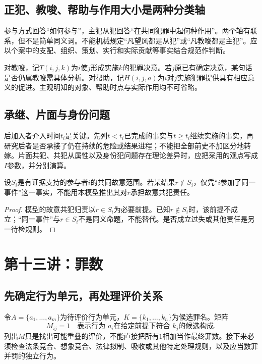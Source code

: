 \subsection{正犯、教唆、帮助与作用大小是两种分类轴}
参与方式回答“如何参与”，主犯从犯回答“在共同犯罪中起何种作用”。两个轴有联系，但不是简单同义词。不能机械规定“凡望风都是从犯”或“凡教唆都是主犯”。应以个案中的支配、组织、策划、实行和实际贡献等事实结合规范作判断。

对教唆，记$T(i,j,k)$为$i$使$j$形成实施$k$的犯罪决意。若$j$原已有确定决意，某句话是否仍属教唆需具体分析。对帮助，记$H(i,j,a)$为$i$对$j$实施犯罪提供具有相应意义的促进。主观明知的对象、帮助时点与实际作用均不可省略。

\subsection{承继、片面与身份问题}
后加入者介入时间$t_i$是关键。先列$t<t_i$已完成的事实与$t\ge t_i$继续实施的事实，再研究后者是否承接了仍在持续的危险或结果进程；不能把全部前史不加区分地转嫁。片面共犯、共犯从属性以及身份犯问题存在理论差异时，应把采用的观点写成$I$参数，并分别演算。

\begin{modelprop}[共同故意范围的集合检查]
设$S_i$是有证据支持的参与者$i$的共同故意范围。若某结果$r\notin S_i$，仅凭“$i$参加了同一事件”这一事实，不能用本模型推出其对$r$承担故意共犯责任。
\end{modelprop}
\begin{proof}
模型的故意共犯归责以$r\in S_i$为必要前提。已知$r\notin S_i$时，该前提不成立；“同一事件”与$r\in S_i$不是同义命题，不能替代。是否成立过失或其他责任是另一待检规则。
\end{proof}


\section{第十三讲：罪数}
\subsection{先确定行为单元，再处理评价关系}
令$A=\{a_1,\ldots,a_m\}$为待评价行为单元，$K=\{k_1,\ldots,k_n\}$为候选罪名。矩阵
\[
 M_{ij}=1\quad\text{表示行为 }a_i\text{在给定前提下符合 }k_j\text{的候选构成}.
\]
列出$M$只是找出可能重叠的评价，不能直接把所有$1$相加当作最终罪数。接下来必须检查法条竞合、想象竞合、法律拟制、吸收或其他特定处理规则，以及应当数罪并罚的独立行为。

